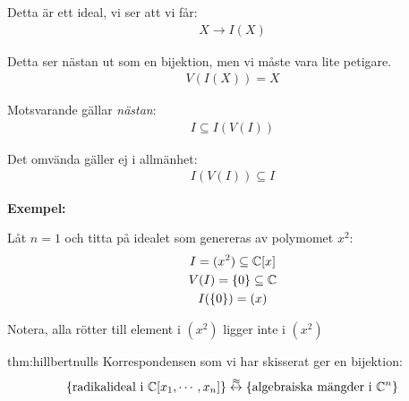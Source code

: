 \noindent Detta är ett ideal, vi ser att vi får:
\begin{equation*}
  \begin{gathered}
    X\to I(X)
  \end{gathered}
\end{equation*}\par
\noindent Detta ser nästan ut som en bijektion, men vi måste vara lite petigare.
\begin{equation*}
  \begin{gathered}
    V(I(X)) = X
  \end{gathered}
\end{equation*}\par
\noindent Motsvarande gällar \textit{nästan}:
\begin{equation*}
  \begin{gathered}
    I\subseteq I(V(I))
  \end{gathered}
\end{equation*}\par
\noindent Det omvända gäller ej i allmänhet:
\begin{equation*}
  \begin{gathered}
    I(V(I))\subseteq I
  \end{gathered}
\end{equation*}
\par\bigskip
\noindent\textbf{Exempel:}\par
\noindent Låt $n=1$ och titta på idealet som genereras av polymomet $x^2$:
\begin{equation*}
  \begin{gathered}
    I = (x^2)\subseteq\mathbb{C}[x]\\
    V(I) = \left\{0\right\}\subseteq \mathbb{C}\\
    I(\left\{0\right\}) = (x)
  \end{gathered}
\end{equation*}\par
\noindent Notera, alla rötter till element i $(x^2)$ ligger inte i $(x^2)$ 
\par\bigskip
\begin{theo}{thm:hillbertnulls}
  Korrespondensen som vi har skisserat ger en bijektion:
  \begin{equation*}
    \begin{gathered}
      \left\{\text{radikalideal i $\mathbb{C}[x_1,\cdots,x_n]$}\right\}\stackrel{\approx}{\leftrightarrow}\left\{\text{algebraiska mängder i }\mathbb{C}^n\right\}
    \end{gathered}
  \end{equation*}
\end{theo}
